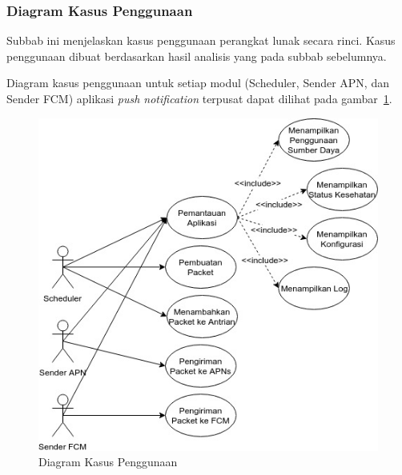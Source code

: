 \subsubsection{Diagram Kasus Penggunaan}
\par Subbab ini menjelaskan kasus penggunaan perangkat lunak secara rinci. Kasus penggunaan dibuat berdasarkan hasil analisis yang pada subbab sebelumnya.
\par Diagram kasus penggunaan untuk setiap modul (Scheduler, Sender APN, dan Sender FCM) aplikasi \textit{push notification} terpusat dapat dilihat pada gambar~\ref{diagram_kasus_penggunaan}.
\begin{figure}[H]
    \centering\includegraphics[width=1\textwidth]{bab3/figures/diagram_kasus_penggunaan.jpg}
    \caption{Diagram Kasus Penggunaan}
    \label{diagram_kasus_penggunaan}
\end{figure}

\newcommand\tableUcDesc[8] {
\begin{longtable}{|p{2.5cm}|p{6.5cm}|}
    \hline
    \textbf{Komponen} & \textbf{Deskripsi} \\ \hline
    Kode & #1 \\ \hline
    Nama & #2 \\ \hline
    Aktor & #3 \\ \hline
    Kondisi Awal & #4 \\ \hline
    Kondisi Akhir & #5 \\ \hline
    Alur Normal & #6 \\ \hline
    Alur Alternatif & #7 \\ \hline
    \caption{Kasus Penggunaan #2}
\end{longtable}
}

